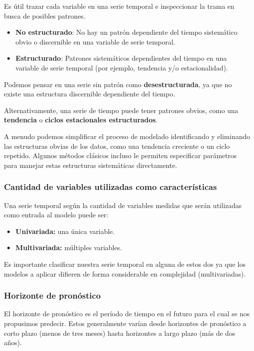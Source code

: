 \documentclass[a4paper,12pt]{article}
\begin{document}
Es útil trazar cada variable en una serie temporal e inspeccionar la trama en busca de posibles patrones.

\begin{itemize}[noitemsep, topsep=2pt]
	\item \textbf{No estructurado}: No hay un patrón dependiente del tiempo sistemático obvio o discernible en una variable de serie temporal.
	\item \textbf{Estructurado}: Patrones sistemáticos dependientes del tiempo en una variable de serie temporal (por ejemplo, tendencia y/o estacionalidad).
\end{itemize}

Podemos pensar en una serie sin patrón como \textbf{desestructurada}, ya que no existe una estructura discernible dependiente del tiempo.

Alternativamente, una serie de tiempo puede tener patrones obvios, como una \textbf{tendencia} o \textbf{ciclos estacionales estructurados}.

A menudo podemos simplificar el proceso de modelado identificando y eliminando las estructuras obvias de los datos, como una tendencia creciente o un ciclo repetido. Algunos métodos clásicos incluso le permiten especificar parámetros para manejar estas estructuras sistemáticas directamente.

\subsubsection{Cantidad de variables utilizadas como características}

Una serie temporal según la cantidad de variables medidas que serán utilizadas como entrada al modelo puede ser:
\begin{itemize}[noitemsep, topsep=2pt]
	\item \textbf{Univariada:} una única variable.
	\item \textbf{Multivariada:} múltiples variables. 
\end{itemize}

Es importante clasificar nuestra serie temporal en alguna de estos dos ya que los modelos a aplicar difieren de forma considerable en complejidad (multivariadas).

\subsubsection{Horizonte de pronóstico}

El horizonte de pronóstico es el período de tiempo en el futuro para el cual se nos propusimos predecir. Estos generalmente varían desde horizontes de pronóstico a corto plazo (menos de tres meses) hasta horizontes a largo plazo (más de dos años).
\end{document}
